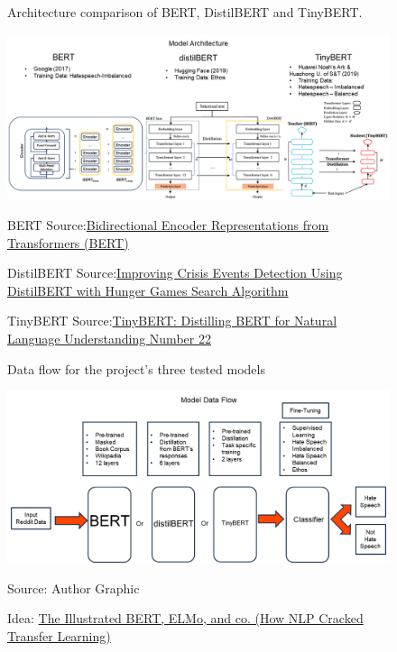\documentclass[conference]{IEEEtran}
\begin{document}
\newpage
\onecolumn
\label{Appendix A}
\appendix
\begin{figure} [ht!]
    \centering
    \caption{Architecture comparison of BERT, DistilBERT and TinyBERT.}
    \label{fig:model}
    \includegraphics[scale = .5]{Slide1d.PNG}
    \caption*{BERT Source:\href{https://humboldt-wi.github.io/blog/img/seminar/bert/bert_architecture.png}{Bidirectional Encoder Representations from Transformers (BERT)}}
    \caption*{DistilBERT Source:\href{https://www.researchgate.net/profile/Alhassan-Mabrouk/publication/358239462/figure/fig2/AS:1120931644747777@1644262338087/The-DistilBERT-model-architecture-and-components.png}{Improving Crisis Events Detection Using DistilBERT with Hunger Games Search Algorithm}}
    \caption*{TinyBERT Source:\href{https://user-images.githubusercontent.com/38907104/90865208-fe72ee80-e3cc-11ea-869a-984330992d2f.png}{TinyBERT: Distilling BERT for Natural Language Understanding Number 22}}
\end{figure}
\begin{figure} [ht!]
    \centering
    \caption{Data flow for the project's three tested models}
    \label{fig:flow}
    \includegraphics[scale = 0.5]{Slide2c.PNG}
    \caption*{Source: Author Graphic} 
    \caption*{Idea: \href{https://jalammar.github.io/images/BERT-classification-spam.png}{The Illustrated BERT, ELMo, and co. (How NLP Cracked Transfer Learning)}}
\end{figure}
\end{document}
